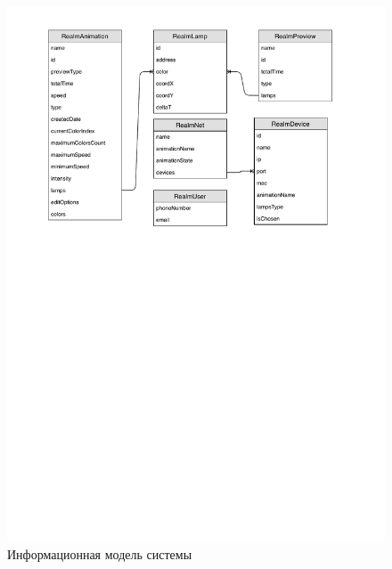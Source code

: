 \label{app:er}

~
\begin{figure}[H]
\centering
	\includegraphics[scale=0.8]{figures/er_diagram.pdf}
	\caption{Информационная модель системы}
	\label{fig:appendices:er}
\end{figure}
